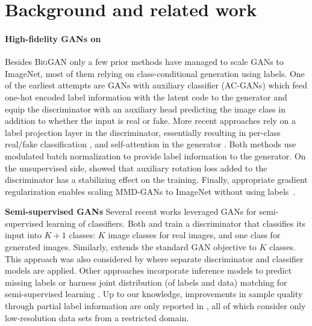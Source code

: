 \documentclass{article}
\newcommand{\biggan}{\textsc{BigGAN}}
\begin{document}
\section{Background and related work}
\paragraph{High-fidelity GANs on \imagenet{}} Besides \biggan{} \cite{brock2018large} only a few prior methods have managed to scale GANs to ImageNet, most of them relying on class-conditional generation using labels. One of the earliest attempts are GANs with auxiliary classifier (AC-GANs) \cite{odena2017conditional} which feed one-hot encoded label information with the latent code to the generator and equip the discriminator with an auxiliary head predicting the image class in addition to whether the input is real or fake. More recent approaches rely on a label projection layer in the discriminator, essentially resulting in per-class real/fake classification \cite{miyato2018cgans}, and  self-attention in the generator \cite{zhang2018self}. Both methods use modulated batch normalization \cite{de2017modulating} to provide label information to the generator. On the unsupervised side, \citet{chen2019self} showed that auxiliary rotation loss added to the discriminator has a stabilizing effect on the training. Finally, appropriate gradient regularization enables scaling MMD-GANs to ImageNet without using labels~\cite{arbel2018gradient}.

\textbf{Semi-supervised GANs} \quad Several recent works leveraged GANs for semi-supervised learning of classifiers. Both \citet{salimans2016improved} and \citet{odena2016semi} train a discriminator that classifies its input into $K+1$ classes: $K$ image classes for real images, and one class for generated images. Similarly, \citet{springenberg2015unsupervised} extends the standard GAN objective to $K$ classes. This approach was also considered by \citet{li2017triple} where separate discriminator and classifier models are applied. Other approaches incorporate inference models to predict missing labels \citep{deng2017structured} or harness joint distribution (of labels and data) matching for semi-supervised learning \citep{gan2017triangle}. Up to our knowledge, improvements in sample quality through partial label information are only reported in \citet{li2017triple, deng2017structured, sricharan2017semi}, all of which consider only low-resolution data sets from a restricted domain.
\end{document}
